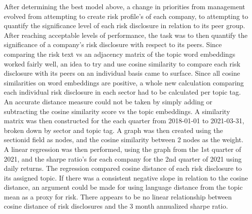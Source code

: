 \documentclass[11pt]{article}
\begin{document}
After determining the best model above, a change in priorities from management evolved from attempting to create risk profile's of each company, to attempting to quantify the significance level of each risk disclosure in relation to its peer group.  After reaching acceptable levels of performance, the task was to then quantify the significance of a company's risk disclosure with respect to its peers.  Since comparing the risk text vs an adjacency matrix of the topic word embeddings worked fairly well, an idea to try and use cosine similarity to compare each risk disclosure with its peers on an individual basis came to surface.  Since all cosine similarities on word embeddings are positive, a whole new calculation comparing each individual risk disclosure in each sector had to be calculated per topic tag.  An accurate distance measure could not be taken by simply adding or subtracting the cosine similarity score vs the topic embeddings. A similarity matrix was then constructed for the each quarter from 2018-01-01 to 2021-03-31, broken down by sector and topic tag.  A graph was then created using the sectionid field as nodes, and the cosine similarity between 2 nodes as the weight.   A linear regression was then performed, using the graph from the 1st quarter of 2021, and the sharpe ratio's for each company for the 2nd quarter of 2021 using daily returns.  The regression compared cosine distance of each risk disclosure to its assigned topic.  If there was a consistent negative slope in relation to the cosine distance, an argument could be made for using language distance from the topic mean as a proxy for risk.  There appears to be no linear relationship between cosine distance of risk disclosures and the 3 month annualized sharpe ratio.  

\vspace{5 mm} 
\end{document}

